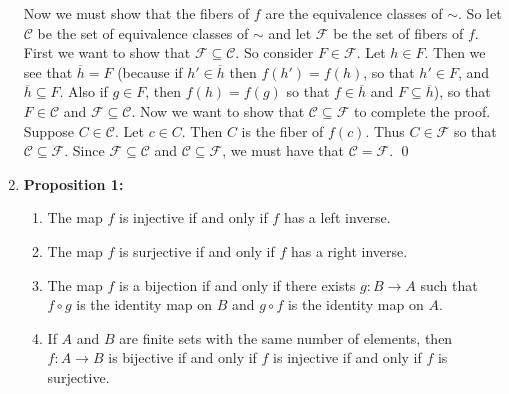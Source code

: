\begin{enumerate}
      Now we must show that the fibers of $f$ are the equivalence classes of
      $\sim$. So let $\mathcal{C}$ be the set of equivalence classes of $\sim$ 
      and let  $\mathcal{F}$ be the set of fibers of $f$. First we want to show
      that $\mathcal{F} \subseteq \mathcal{C}$. So consider
      $F \in \mathcal{F}$. Let $h \in F$. Then we see that $\overline{h} = F$
      (because if $h' \in \overline{h}$ then $f(h') = f(h)$, so that $h' \in F$,
      and $\overline{h} \subseteq F$. Also if $g \in F$, then $f(h) = f(g)$ so  
      that $f \in \overline{h}$ and $F \subseteq \overline{h}$), so that $F \in
      \mathcal{C}$ and $\mathcal{F} \subseteq \mathcal{C}$. Now we want to show
      that $\mathcal{C} \subseteq \mathcal{F}$ to complete the proof. Suppose
      $C \in \mathcal{C}$. Let $c \in C$. Then $C$ is the fiber of $f(c)$. Thus
      $C \in \mathcal{F}$ so that $\mathcal{C} \subseteq \mathcal{F}$. Since
      $\mathcal{F} \subseteq \mathcal{C}$ and
      $\mathcal{C} \subseteq \mathcal{F}$, we must have that
      $\mathcal{C} = \mathcal{F}$. \qed
   \item[0.1.8] \textbf{Proposition 1:}
                \begin{enumerate}
                   \item The map $f$ is injective if and only if $f$ has a left
                         inverse.
                   \item The map $f$ is surjective if and only if $f$ has a
                         right inverse.
                   \item The map $f$ is a bijection if and only if there exists
                         $g : B \rightarrow A$ such that $f \circ g$ is the
                         identity map on $B$ and $g \circ f$ is the identity map
                         on $A$.
                   \item If $A$ and $B$ are finite sets with the same number of
                         elements, then $f : A \rightarrow B$ is bijective if
                         and only if $f$ is injective if and only if $f$ is
                         surjective.
                \end{enumerate}


\end{enumerate}
